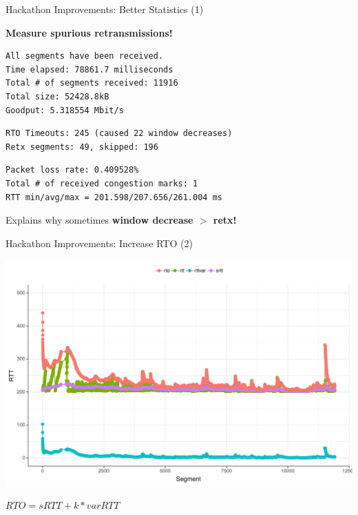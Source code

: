 \begin{frame}[fragile]{Hackathon Improvements: Better Statistics (1)}

\textbf{Measure spurious retransmissions!}

\footnotesize
\begin{verbatim}
All segments have been received.
Time elapsed: 78861.7 milliseconds
Total # of segments received: 11916
Total size: 52428.8kB
Goodput: 5.318554 Mbit/s
\end{verbatim}
\begin{verbatim}
RTO Timeouts: 245 (caused 22 window decreases)
Retx segments: 49, skipped: 196
\end{verbatim}
\begin{verbatim}
Packet loss rate: 0.409528%
Total # of received congestion marks: 1
RTT min/avg/max = 201.598/207.656/261.004 ms
\end{verbatim}

\normalsize

\pause
Explains why sometimes \textbf{window decrease $>$ retx!}



\end{frame}


\begin{frame}[fragile]{Hackathon Improvements: Increase RTO (2)}

\includegraphics[width=\linewidth]{images/rtt_rto200ms.png}

$RTO = sRTT + k * varRTT$

\end{frame}


